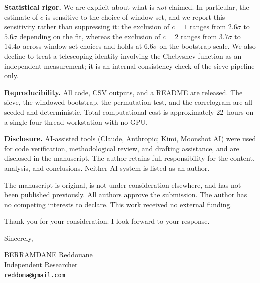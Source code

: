 \documentclass[11pt]{article}
\begin{document}
\medskip
\noindent \textbf{Statistical rigor.} We are explicit about what is
\emph{not} claimed. In particular, the estimate of $c$ is sensitive to
the choice of window set, and we report this sensitivity rather than
suppressing it: the exclusion of $c = 1$ ranges from $2.6\sigma$ to
$5.6\sigma$ depending on the fit, whereas the exclusion of $c = 2$
ranges from $3.7\sigma$ to $14.4\sigma$ across window-set choices and
holds at $6.6\sigma$ on the bootstrap scale. We also decline to treat a
telescoping
identity involving the Chebyshev function as an independent
measurement; it is an internal consistency check of the sieve
pipeline only.

\medskip
\noindent \textbf{Reproducibility.} All code, CSV outputs, and a
README are released. The sieve, the windowed bootstrap, the
permutation test, and the correlogram are all seeded and deterministic.
Total computational cost is approximately 22~hours on a single
four-thread workstation with no GPU.

\medskip
\noindent \textbf{Disclosure.} AI-assisted tools (Claude, Anthropic;
Kimi, Moonshot AI) were used for code verification, methodological
review, and drafting assistance, and are disclosed in the manuscript.
The author retains full responsibility for the content, analysis, and
conclusions. Neither AI system is listed as an author.

\medskip
\noindent The manuscript is original, is not under consideration
elsewhere, and has not been published previously. All authors approve
the submission. The author has no competing interests to declare. This
work received no external funding.

\medskip
\noindent Thank you for your consideration. I look forward to your
response.

\bigskip
\noindent Sincerely,


\vspace{1.5em}
\noindent BERRAMDANE Reddouane\\
Independent Researcher\\
\texttt{reddoma@gmail.com}
\end{document}
